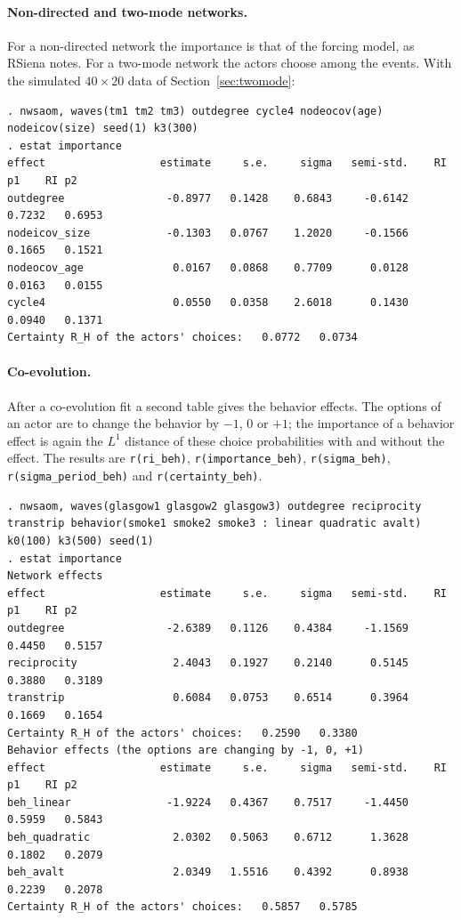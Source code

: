 \paragraph{Non-directed and two-mode networks.} For a non-directed network the importance is that of the forcing model, as RSiena notes. For a two-mode network the actors choose among the events. With the simulated $40\times20$ data of Section~\ref{sec:twomode}:
\begin{lstlisting}
. nwsaom, waves(tm1 tm2 tm3) outdegree cycle4 nodeocov(age) nodeicov(size) seed(1) k3(300)
. estat importance
effect                  estimate     s.e.     sigma   semi-std.    RI p1    RI p2
outdegree                -0.8977   0.1428    0.6843     -0.6142   0.7232   0.6953
nodeicov_size            -0.1303   0.0767    1.2020     -0.1566   0.1665   0.1521
nodeocov_age              0.0167   0.0868    0.7709      0.0128   0.0163   0.0155
cycle4                    0.0550   0.0358    2.6018      0.1430   0.0940   0.1371
Certainty R_H of the actors' choices:   0.0772   0.0734
\end{lstlisting}
\paragraph{Co-evolution.} After a co-evolution fit a second table gives the behavior effects. The options of an actor are to change the behavior by $-1$, $0$ or $+1$; the importance of a behavior effect is again the $L^1$ distance of these choice probabilities with and without the effect. The results are \texttt{r(ri\_beh)}, \texttt{r(importance\_beh)}, \texttt{r(sigma\_beh)}, \texttt{r(sigma\_period\_beh)} and \texttt{r(certainty\_beh)}.
\begin{lstlisting}
. nwsaom, waves(glasgow1 glasgow2 glasgow3) outdegree reciprocity transtrip behavior(smoke1 smoke2 smoke3 : linear quadratic avalt) k0(100) k3(500) seed(1)
. estat importance
Network effects
effect                  estimate     s.e.     sigma   semi-std.    RI p1    RI p2
outdegree                -2.6389   0.1126    0.4384     -1.1569   0.4450   0.5157
reciprocity               2.4043   0.1927    0.2140      0.5145   0.3880   0.3189
transtrip                 0.6084   0.0753    0.6514      0.3964   0.1669   0.1654
Certainty R_H of the actors' choices:   0.2590   0.3380
Behavior effects (the options are changing by -1, 0, +1)
effect                  estimate     s.e.     sigma   semi-std.    RI p1    RI p2
beh_linear               -1.9224   0.4367    0.7517     -1.4450   0.5959   0.5843
beh_quadratic             2.0302   0.5063    0.6712      1.3628   0.1802   0.2079
beh_avalt                 2.0349   1.5516    0.4392      0.8938   0.2239   0.2078
Certainty R_H of the actors' choices:   0.5857   0.5785
\end{lstlisting}

